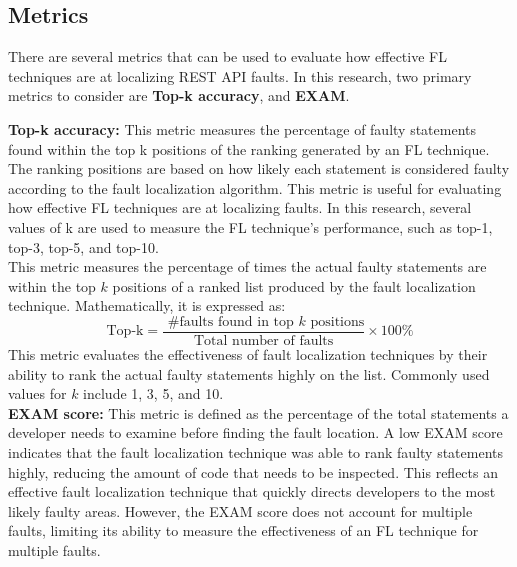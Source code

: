 \documentclass[conference]{IEEEtran}
\begin{document}
\subsection{Metrics}
\label{sec:metrics}

There are several metrics that can be used to evaluate how effective FL techniques are at localizing REST API faults. In this research, two primary metrics to consider are \textbf{Top-k accuracy}, and \textbf{EXAM}.

     \textbf{Top-k accuracy:} This metric measures the percentage of faulty statements found within the top k positions of the ranking generated by an FL technique. The ranking positions are based on how likely each statement is considered faulty according to the fault localization algorithm. This metric is useful for evaluating how effective FL techniques are at localizing faults. In this research, several values of k are used to measure the FL technique's performance, such as top-1, top-3, top-5, and top-10.
    \\
    This metric measures the percentage of times the actual faulty statements are within the top $k$ positions of a ranked list produced by the fault localization technique. Mathematically, it is expressed as:
    \[
    \text{Top-k} = \frac{\text{ \#faults found in top } k \text{ positions}}{\text{Total number of faults}} \times 100\%
    \]
    This metric evaluates the effectiveness of fault localization techniques by their ability to rank the actual faulty statements highly on the list. Commonly used values for $k$ include 1, 3, 5, and 10.
    \\

    \textbf{EXAM score:}  This metric is defined as the percentage of the total statements a developer needs to examine before finding the fault location. A low EXAM score indicates that the fault localization technique was able to rank faulty statements highly, reducing the amount of code that needs to be inspected. This reflects an effective fault localization technique that quickly directs developers to the most likely faulty areas. However, the EXAM score does not account for multiple faults, limiting its ability to measure the effectiveness of an FL technique for multiple faults.
\end{document}
